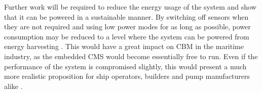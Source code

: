 Further work will be required to reduce the energy usage of the system and show that it can be powered in a sustainable manner.
By switching off sensors when they are not required and using low power modes for as long as possible, power consumption may be reduced to a level where the system can be powered from energy harvesting \cite{Embedded_Energy_Harvesting}.
This would have a great impact on CBM in the maritime industry, as the embedded CMS would become essentially free to run.
Even if the performance of the system is compromised slightly, this would present a much more realistic proposition for ship operators, builders and pump manufacturers alike \cite{CBM_norway_bd}.